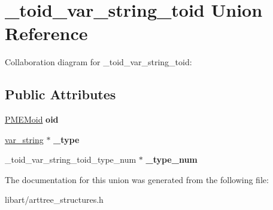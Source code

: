 \hypertarget{union__toid__var__string__toid}{}\section{\+\_\+toid\+\_\+var\+\_\+string\+\_\+toid Union Reference}
\label{union__toid__var__string__toid}


Collaboration diagram for \+\_\+toid\+\_\+var\+\_\+string\+\_\+toid\+:
\subsection*{Public Attributes}
\begin{DoxyCompactItemize}
\item 
\mbox{\label{union__toid__var__string__toid_a8a367ef9c8c3610112991d68c036bc69}} 
\hyperlink{structpmemoid}{P\+M\+E\+Moid} {\bfseries oid}
\item 
\mbox{\label{union__toid__var__string__toid_ac1b22352535d5b9c8b0f6daa4639da50}} 
\hyperlink{struct__var__string}{var\+\_\+string} $\ast$ {\bfseries \+\_\+type}
\item 
\mbox{\label{union__toid__var__string__toid_a6d7a023cecc5aa9c161d5373d2f1bc20}} 
\+\_\+toid\+\_\+var\+\_\+string\+\_\+toid\+\_\+type\+\_\+num $\ast$ {\bfseries \+\_\+type\+\_\+num}
\end{DoxyCompactItemize}


The documentation for this union was generated from the following file\+:\begin{DoxyCompactItemize}
\item 
libart/arttree\+\_\+structures.\+h\end{DoxyCompactItemize}
